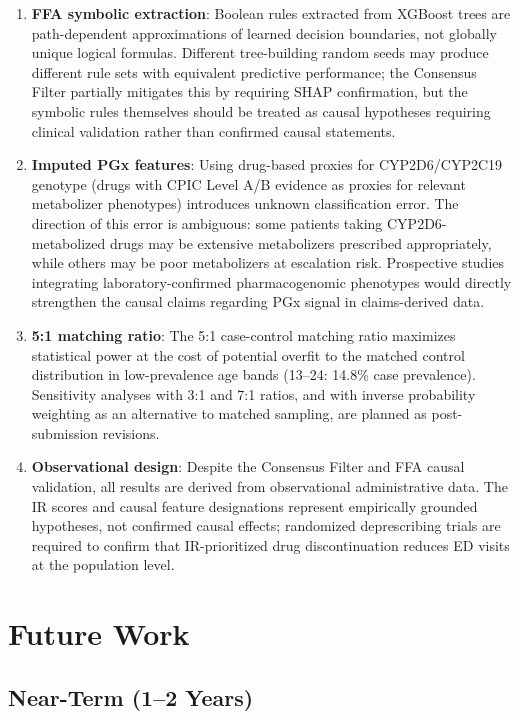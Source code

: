 \documentclass[
  12pt,
]{book}
\providecommand{\tightlist}{%
  \setlength{\itemsep}{0pt}\setlength{\parskip}{0pt}}
\begin{document}
\begin{enumerate}
\def\labelenumi{\arabic{enumi}.}
\setcounter{enumi}{4}
\tightlist
\item
  \textbf{FFA symbolic extraction}: Boolean rules extracted from XGBoost
  trees are path-dependent approximations of learned decision
  boundaries, not globally unique logical formulas. Different
  tree-building random seeds may produce different rule sets with
  equivalent predictive performance; the Consensus Filter partially
  mitigates this by requiring SHAP confirmation, but the symbolic rules
  themselves should be treated as causal hypotheses requiring clinical
  validation rather than confirmed causal statements.
\item
  \textbf{Imputed PGx features}: Using drug-based proxies for
  CYP2D6/CYP2C19 genotype (drugs with CPIC Level A/B evidence as proxies
  for relevant metabolizer phenotypes) introduces unknown classification
  error. The direction of this error is ambiguous: some patients taking
  CYP2D6-metabolized drugs may be extensive metabolizers prescribed
  appropriately, while others may be poor metabolizers at escalation
  risk. Prospective studies integrating laboratory-confirmed
  pharmacogenomic phenotypes would directly strengthen the causal claims
  regarding PGx signal in claims-derived data.
\item
  \textbf{5:1 matching ratio}: The 5:1 case-control matching ratio
  maximizes statistical power at the cost of potential overfit to the
  matched control distribution in low-prevalence age bands (13--24:
  14.8\% case prevalence). Sensitivity analyses with 3:1 and 7:1 ratios,
  and with inverse probability weighting as an alternative to matched
  sampling, are planned as post-submission revisions.
\item
  \textbf{Observational design}: Despite the Consensus Filter and FFA
  causal validation, all results are derived from observational
  administrative data. The IR scores and causal feature designations
  represent empirically grounded hypotheses, not confirmed causal
  effects; randomized deprescribing trials are required to confirm that
  IR-prioritized drug discontinuation reduces ED visits at the
  population level.
\end{enumerate}

\chapter{Future Work}\label{sec-future}

\section{Near-Term (1--2 Years)}\label{near-term-12-years}
\end{document}

